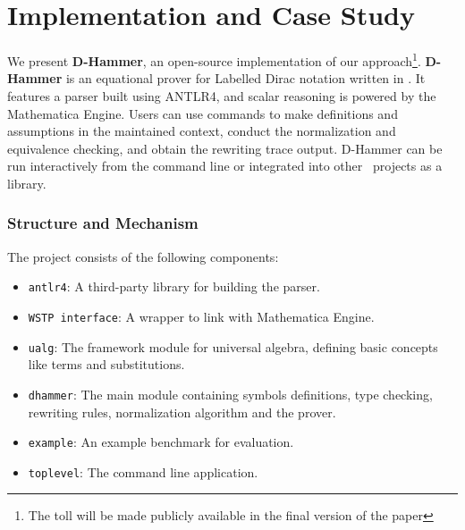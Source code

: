 
\section{Implementation and Case Study}
We present \textbf{D-Hammer}, an open-source
implementation of our approach\footnote{The toll will be made publicly
available in the final version of the paper}.  \textbf{D-Hammer} is an
equational prover for Labelled Dirac notation written in \CC.  It
features a parser built using ANTLR4, and scalar reasoning is powered
by the Mathematica Engine. Users can use commands to make definitions
and assumptions in the maintained context, conduct the normalization
and equivalence checking, and obtain the rewriting trace output.
D-Hammer can be run interactively from the command line or integrated
into other \CC\ projects as a library.


\subsubsection{Structure and Mechanism} 
The project consists of the following components:
\begin{itemize}
    \item \texttt{antlr4}: A third-party library for building the parser.
    \item \texttt{WSTP interface}: A wrapper to link with Mathematica Engine.
    \item \texttt{ualg}: The framework module for universal algebra, defining basic concepts like terms and substitutions.
    \item \texttt{dhammer}: The main module containing symbols definitions, type checking, rewriting rules, normalization algorithm and the prover.
    \item \texttt{example}: An example benchmark for evaluation.
    \item \texttt{toplevel}: The command line application.
\end{itemize}

% 

